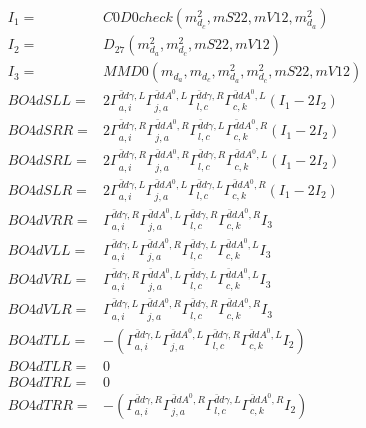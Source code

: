 \documentclass[A4,landscape]{article}
\begin{document}
\begin{align} 
I_1 = & C0D0check(m^2_{d_{{c}}}, mS22, mV12, m^2_{d_{{a}}}) \\ 
I_2 = & D_{27}(m^2_{d_{{a}}}, m^2_{d_{{c}}}, mS22, mV12) \\ 
I_3 = & MMD0(m_{d_{{a}}}, m_{d_{{c}}}, m^2_{d_{{a}}}, m^2_{d_{{c}}}, mS22, mV12) \\ 
  BO4dSLL= & 2  \Gamma^{\bar{d}d \gamma ,L}_{a, i} \Gamma^{\bar{d}d A^0 ,L}_{j, a} \Gamma^{\bar{d}d \gamma ,R}_{l, c} \Gamma^{\bar{d}d A^0 ,L}_{c, k} (I_1 - 2 I_2) \\ 
  BO4dSRR= & 2  \Gamma^{\bar{d}d \gamma ,R}_{a, i} \Gamma^{\bar{d}d A^0 ,R}_{j, a} \Gamma^{\bar{d}d \gamma ,L}_{l, c} \Gamma^{\bar{d}d A^0 ,R}_{c, k} (I_1 - 2 I_2) \\ 
  BO4dSRL= & 2  \Gamma^{\bar{d}d \gamma ,R}_{a, i} \Gamma^{\bar{d}d A^0 ,R}_{j, a} \Gamma^{\bar{d}d \gamma ,R}_{l, c} \Gamma^{\bar{d}d A^0 ,L}_{c, k} (I_1 - 2 I_2) \\ 
  BO4dSLR= & 2  \Gamma^{\bar{d}d \gamma ,L}_{a, i} \Gamma^{\bar{d}d A^0 ,L}_{j, a} \Gamma^{\bar{d}d \gamma ,L}_{l, c} \Gamma^{\bar{d}d A^0 ,R}_{c, k} (I_1 - 2 I_2) \\ 
  BO4dVRR= &  \Gamma^{\bar{d}d \gamma ,R}_{a, i} \Gamma^{\bar{d}d A^0 ,L}_{j, a} \Gamma^{\bar{d}d \gamma ,R}_{l, c} \Gamma^{\bar{d}d A^0 ,R}_{c, k} I_3 \\ 
  BO4dVLL= &  \Gamma^{\bar{d}d \gamma ,L}_{a, i} \Gamma^{\bar{d}d A^0 ,R}_{j, a} \Gamma^{\bar{d}d \gamma ,L}_{l, c} \Gamma^{\bar{d}d A^0 ,L}_{c, k} I_3 \\ 
  BO4dVRL= &  \Gamma^{\bar{d}d \gamma ,R}_{a, i} \Gamma^{\bar{d}d A^0 ,L}_{j, a} \Gamma^{\bar{d}d \gamma ,L}_{l, c} \Gamma^{\bar{d}d A^0 ,L}_{c, k} I_3 \\ 
  BO4dVLR= &  \Gamma^{\bar{d}d \gamma ,L}_{a, i} \Gamma^{\bar{d}d A^0 ,R}_{j, a} \Gamma^{\bar{d}d \gamma ,R}_{l, c} \Gamma^{\bar{d}d A^0 ,R}_{c, k} I_3 \\ 
  BO4dTLL= & -( \Gamma^{\bar{d}d \gamma ,L}_{a, i} \Gamma^{\bar{d}d A^0 ,L}_{j, a} \Gamma^{\bar{d}d \gamma ,R}_{l, c} \Gamma^{\bar{d}d A^0 ,L}_{c, k} I_2) \\ 
  BO4dTLR= & 0 \\ 
  BO4dTRL= & 0 \\ 
  BO4dTRR= & -( \Gamma^{\bar{d}d \gamma ,R}_{a, i} \Gamma^{\bar{d}d A^0 ,R}_{j, a} \Gamma^{\bar{d}d \gamma ,L}_{l, c} \Gamma^{\bar{d}d A^0 ,R}_{c, k} I_2) \\ 
\end{align} 
\end{document}
